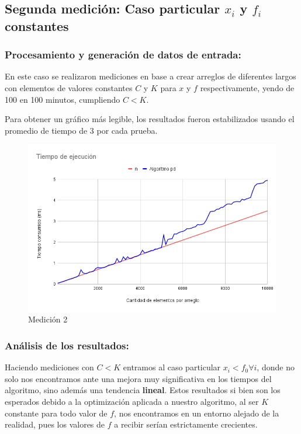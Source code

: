 \subsection{Segunda medición: Caso particular $x_i$ y $f_i$ constantes}

\subsubsection{Procesamiento y generación de datos de entrada:} 
En este caso se realizaron mediciones en base a crear arreglos de diferentes largos con elementos de valores constantes $C$ y $K$ para $x$ y $f$ respectivamente, yendo de  100 en 100 minutos, cumpliendo $C < K$.

Para obtener un gráfico más legible, los resultados fueron estabilizados usando el promedio de tiempo de 3 por cada prueba.

\begin{figure}[H]
    \centering
    \includegraphics[width=1\textwidth]{img/tiempos_10k_100_xi_f0_constantes.png}
    \caption{Medición 2}
\end{figure}

\subsubsection{Análisis de los resultados:}
Haciendo mediciones con $C < K$ entramos al caso particular $x_i < f_0\forall i $, donde no solo nos encontramos ante una mejora muy significativa en los tiempos del algoritmo, sino además una tendencia \textbf{lineal}. Estos resultados si bien son los esperados debido a la optimización aplicada a nuestro algoritmo, al ser $K$ constante para todo valor de $f$, nos encontramos en un entorno alejado de la realidad, pues los valores de $f$ a recibir serían estrictamente crecientes. 

